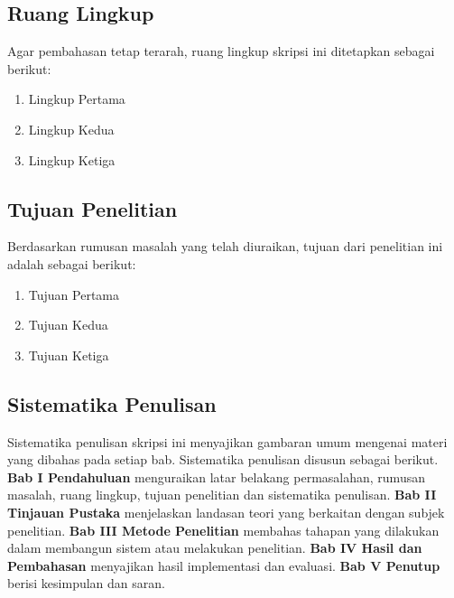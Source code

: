 \subsection{Ruang Lingkup}
\justifying

Agar pembahasan tetap terarah, ruang lingkup skripsi ini ditetapkan sebagai berikut:

\begin{enumerate}
	\item Lingkup Pertama
	\item Lingkup Kedua
	\item Lingkup Ketiga
\end{enumerate}

\subsection{Tujuan Penelitian}
\justifying

Berdasarkan rumusan masalah yang telah diuraikan, tujuan dari penelitian ini adalah sebagai berikut:

\begin{enumerate}
	\item Tujuan Pertama
	\item Tujuan Kedua
	\item Tujuan Ketiga
\end{enumerate}

\subsection{Sistematika Penulisan}
\justifying

Sistematika penulisan skripsi ini menyajikan gambaran umum mengenai materi yang dibahas pada setiap bab. Sistematika penulisan disusun sebagai berikut. \textbf{Bab I Pendahuluan} menguraikan latar belakang permasalahan, rumusan masalah, ruang lingkup, tujuan penelitian dan sistematika penulisan. \textbf{Bab II Tinjauan Pustaka} menjelaskan landasan teori yang berkaitan dengan subjek penelitian. \textbf{Bab III Metode Penelitian} membahas tahapan yang dilakukan dalam membangun sistem atau melakukan penelitian. \textbf{Bab IV Hasil dan Pembahasan} menyajikan hasil implementasi dan evaluasi. \textbf{Bab V Penutup} berisi kesimpulan dan saran.
